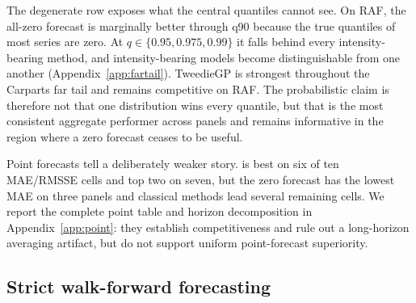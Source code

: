 The degenerate row exposes what the central quantiles cannot see. On RAF,
the all-zero forecast is marginally better through q90 because the true
quantiles of most series are zero. At $q\in\{0.95,0.975,0.99\}$ it falls
behind every intensity-bearing method, and intensity-bearing models become
distinguishable from one another (Appendix~\ref{app:fartail}). TweedieGP
is strongest throughout the Carparts far tail and remains competitive on
RAF. The probabilistic claim is therefore not that one distribution wins
every quantile, but that \EBB{} is the most consistent aggregate
performer across panels and remains informative in the region where a zero
forecast ceases to be useful.

Point forecasts tell a deliberately weaker story. \EBB{} is best on six
of ten MAE/RMSSE cells and top two on seven, but the zero forecast has the
lowest MAE on three panels and classical methods lead several remaining
cells. We report the complete point table and horizon decomposition in
Appendix~\ref{app:point}: they establish competitiveness and rule out a
long-horizon averaging artifact, but do not support uniform point-forecast
superiority.

\subsection{Strict walk-forward forecasting}\label{sec:walkforward}

